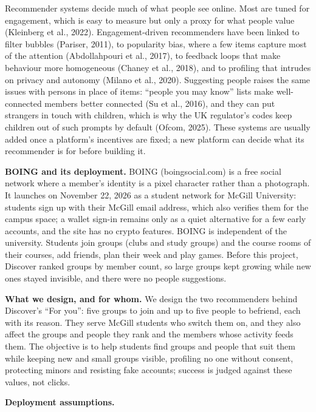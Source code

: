 \documentclass[11pt,letterpaper]{article}
\begin{document}
Recommender systems decide much of what people see online. Most are tuned for engagement, which is easy to
measure but only a proxy for what people value (Kleinberg et al., 2022). Engagement-driven recommenders have
been linked to filter bubbles (Pariser, 2011), to popularity bias, where a few items capture most of the
attention (Abdollahpouri et al., 2017), to feedback loops that make behaviour more homogeneous (Chaney et al.,
2018), and to profiling that intrudes on privacy and autonomy (Milano et al., 2020). Suggesting people raises
the same issues with persons in place of items: ``people you may know'' lists make well-connected members
better connected (Su et al., 2016), and they can put strangers in touch with children, which is why the UK
regulator's codes keep children out of such prompts by default (Ofcom, 2025). These systems are usually added
once a platform's incentives are fixed; a new platform can decide what its recommender is for before building
it.

\textbf{BOING and its deployment.} BOING (boingsocial.com) is a free social network where a member's identity
is a pixel character rather than a photograph. It launches on November 22, 2026 as a student network for
McGill University: students sign up with their McGill email address, which also verifies them for the campus
space; a wallet sign-in remains only as a quiet alternative for a few early accounts, and the site has no
crypto features. BOING is independent of the university. Students join groups (clubs and study groups) and the
course rooms of their courses, add friends, plan their week and play games. Before this project, Discover
ranked groups by member count, so large groups kept growing while new ones stayed invisible, and there were no
people suggestions.

\textbf{What we design, and for whom.} We design the two recommenders behind Discover's ``For you'': five
groups to join and up to five people to befriend, each with its reason. They serve McGill students who switch
them on, and they also affect the groups and people they rank and the members whose activity feeds them. The
objective is to help students find groups and people that suit them while keeping new and small groups
visible, profiling no one without consent, protecting minors and resisting fake accounts; success is judged
against these values, not clicks.

\textbf{Deployment assumptions.}
\end{document}
